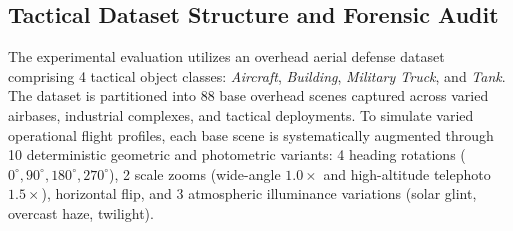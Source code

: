 \documentclass[conference]{IEEEtran}
\begin{document}
\subsection{Tactical Dataset Structure and Forensic Audit}
The experimental evaluation utilizes an overhead aerial defense dataset comprising 4 tactical object classes: \textit{Aircraft}, \textit{Building}, \textit{Military Truck}, and \textit{Tank}. The dataset is partitioned into 88 base overhead scenes captured across varied airbases, industrial complexes, and tactical deployments. To simulate varied operational flight profiles, each base scene is systematically augmented through 10 deterministic geometric and photometric variants: 4 heading rotations ($0^\circ, 90^\circ, 180^\circ, 270^\circ$), 2 scale zooms (wide-angle $1.0\times$ and high-altitude telephoto $1.5\times$), horizontal flip, and 3 atmospheric illuminance variations (solar glint, overcast haze, twilight).
\end{document}
